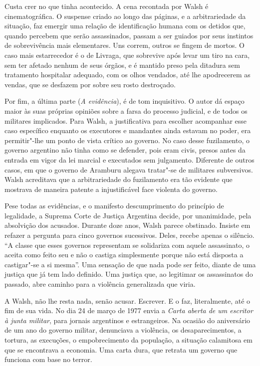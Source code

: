 Custa crer no que tinha acontecido. A cena recontada por Walsh é cinematográfica.
O suspense criado ao longo das páginas, e a arbitrariedade da situação,
faz emergir uma relação de identificação humana com os detidos que,
quando percebem que serão assassinados, passam a ser guiados por
seus instintos de sobrevivência mais elementares. Uns correm, outros se fingem de mortos.
O caso mais estarrecedor é o de Livraga, que sobrevive após levar um
tiro na cara, sem ter afetado nenhum de seus órgãos, e é mantido preso
pela ditadura sem tratamento hospitalar adequado, com os olhos vendados,
até lhe apodrecerem as vendas, que se desfazem por sobre seu rosto
destroçado.

Por fim, a última parte (\emph{A evidência}), é de tom inquisitivo. O
autor dá espaço maior às suas próprias opiniões sobre a farsa do
processo judicial, e de todos os militares implicados. Para Walsh, a
justificativa para escolher acompanhar esse caso específico enquanto os
executores e mandantes ainda estavam no poder, era permitir"-lhe
um ponto de vista crítico ao governo. No caso desse fuzilamento, o
governo argentino não tinha como se defender, pois eram civis,
presos antes da entrada em vigor da lei marcial e executados sem
julgamento. Diferente de outros casos, em que o governo de Aramburu
alegava tratar"-se de militares subversivos. Walsh acreditava que
a arbitrariedade do fuzilamento era tão evidente que mostrava de
maneira patente a injustificável face violenta do governo.

Pese todas as
evidências, e o manifesto descumprimento do princípio de legalidade, a
Suprema Corte de Justiça Argentina decide, por unanimidade, pela
absolvição dos acusados. Durante doze anos, Walsh parece obstinado.
Insiste em refazer a pergunta para cinco governos sucessivos. Deles,
recebe apenas o silêncio. ``A classe que esses governos representam se
solidariza com aquele assassinato, o aceita como feito seu e não o
castiga simplesmente porque não está disposta a castigar"-se a si
mesma''. Uma sensação de que nada pode ser feito, diante de uma justiça
que já tem lado definido. Uma justiça que, ao legitimar os assassinatos
do passado, abre caminho para a violência generalizada que viria.

A Walsh, não lhe resta nada, senão acusar. Escrever. E o faz,
literalmente, até o fim de sua vida. No dia 24 de março de 1977 envia a
\emph{Carta aberta de um escritor à junta militar}, para jornais
argentinos e estrangeiros. Na ocasião do aniversário de um ano do
governo militar, denunciava a violência, os desaparecimentos, a tortura,
as execuções, o empobrecimento da população, a situação calamitosa em
que se encontrava a economia. Uma carta dura, que retrata um governo que funciona com
base no terror.

